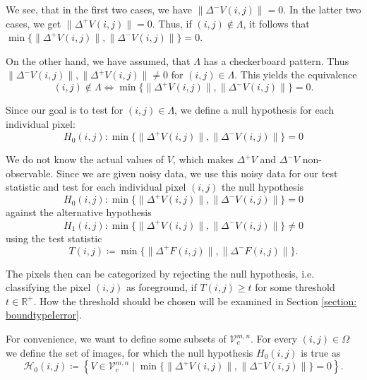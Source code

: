 \documentclass[a4paper,12pt]{article}
\newcommand{\norm}[1]{\lVert#1\rVert}
\theoremstyle{plain}
\theoremstyle{definition}
\begin{document}
We see, that in the first two cases, we have $\norm{\Delta^- V(i, j)} = 0$. In the latter two cases, we get $\norm{\Delta^+ V(i, j)} = 0$. Thus, if $(i, j) \notin \varLambda$, it follows that $\min \{ \norm{\Delta^+ V(i, j)}, \norm{\Delta^- V(i, j)} \} = 0$.

On the other hand, we have assumed, that $\varLambda$ has a checkerboard pattern. Thus $\norm{\Delta^- V(i, j)}, \norm{\Delta^+ V(i, j)} \neq 0$ for $(i, j) \in \varLambda$. This yields the equivalence
\begin{equation*}
	(i, j) \notin \varLambda \Leftrightarrow \min \{ \norm{\Delta^+ V(i, j)}, \norm{\Delta^- V(i, j)} \} = 0.
\end{equation*}

Since our goal is to test for $(i, j) \in \varLambda$, we define a null hypothesis for each individual pixel:
\begin{equation*}
	H_0(i, j): \min \{ \norm{\Delta^+ V(i, j)}, \norm{\Delta^- V(i, j)} \} = 0
\end{equation*}

We do not know the actual values of $V$, which makes $\Delta^+ V$ and $\Delta^- V$ non-observable. Since we are given noisy data, we use this noisy data for our test statistic and test for each individual pixel $(i, j)$ the null hypothesis
\begin{equation}\label{nullhypothesis}
	H_0(i, j): \min \{ \norm{\Delta^+ V(i, j)}, \norm{\Delta^- V(i, j)} \} = 0
\end{equation}
against the alternative hypothesis
\begin{equation}\label{alternativehypothesis}
	H_1(i, j): \min \{ \norm{\Delta^+ V(i, j)}, \norm{\Delta^- V(i, j)} \} \neq 0
\end{equation}
using the test statistic
\begin{equation}\label{teststatistic}
	T(i, j) \coloneqq \min \{ \norm{\Delta^+ F(i, j)}, \norm{\Delta^- F(i, j)} \}.
\end{equation}

The pixels then can be categorized by rejecting the null hypothesis, i.e. classifying the pixel $(i, j)$ as foreground, if $T(i, j) \geq t$ for some threshold $t \in \mathbb{R}^+$. How the threshold should be chosen will be examined in Section \ref{section: boundtypeIerror}.

For convenience, we want to define some subsets of $\mathcal{V}_c^{m, n}$. For every $(i, j) \in \Omega$ we define the set of images, for which the null hypothesis $H_0(i, j)$ is true as
\begin{equation}
	\mathcal{H}_0(i, j) \coloneqq \left\{ V \in \mathcal{V}_c^{m, n} \mid \min \{ \norm{\Delta^+ V(i, j)}, \norm{\Delta^- V(i, j)} \} = 0 \right\}.
\end{equation}
\end{document}
